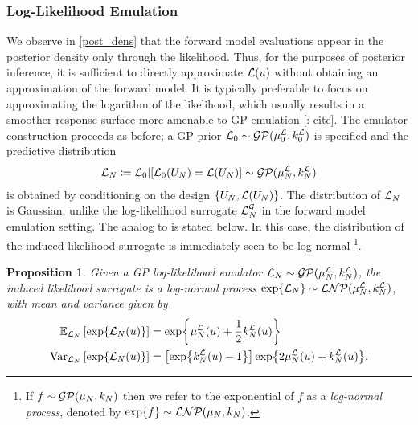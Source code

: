 \documentclass[12pt]{article}
\newtheorem{prop}{Proposition}
\begin{document}
\subsubsection{Log-Likelihood Emulation}
We observe in \ref{post_dens} that the forward model evaluations appear in the posterior density only through the 
likelihood. Thus, for the purposes of posterior inference, it is sufficient to directly approximate $\llik(\Par)$ without 
obtaining an approximation of the forward model. It is typically preferable to focus on approximating the logarithm 
of the likelihood, which usually results in a smoother response surface more amenable to GP emulation [\todo: cite]. 
The emulator construction proceeds as before; a GP prior $\llikPrior \sim \GP(\emMeanPrior{\llik}, \emKerPrior{\llik})$ 
is specified and the predictive distribution 
\begin{align*}
\llikEm[\Ndesign] \Def \llikPrior | [\llikPrior(\designIn) = \llik(\designIn)] \sim \GP(\emMean[\Ndesign]{\llik}, \emKer[\Ndesign]{\llik})
\end{align*}
is obtained by conditioning on the design $\{\designIn, \llik(\designIn)\}$. 
The distribution of $\llikEm[\Ndesign]$ is Gaussian, unlike
the log-likelihood surrogate $\llikEmFwd[\Ndesign]$ in the forward model emulation setting. The analog to 
 is stated below. In this case, the distribution of the induced likelihood 
surrogate is immediately seen to be log-normal
\footnote{If $f \sim \GP(\gpMean, \gpKer)$ then we refer to the exponential of $f$ as a \textit{log-normal process}, 
denoted by $\Exp{f} \sim \LNP(\gpMean, \gpKer)$.}.

\begin{prop} \label{llik_em_lik_emulator_moments}
Given a GP log-likelihood emulator $\llikEm[\Ndesign] \sim \GP(\emMean[\Ndesign]{\llik}, \emKer[\Ndesign]{\llik})$, 
the induced likelihood surrogate is a log-normal process
$\Exp{\llikEm[\Ndesign]} \sim \LNP(\emMean[\Ndesign]{\llik}, \emKer[\Ndesign]{\llik})$, with mean and variance given 
by 
\begin{align}
\E_{\llikEm}\left[\Exp{\llikEm(\Par)} \right] 
&= \Exp{\emMean[\Ndesign]{\llik}(\Par) + \frac{1}{2} \emKer[\Ndesign]{\llik}(\Par)} \\
\Var_{\llikEm}\left[\Exp{\llikEm(\Par)} \right] 
&= \left[\Exp{\emKer[\Ndesign]{\llik}(\Par) - 1} \right] \Exp{2\emMean[\Ndesign]{\llik}(\Par) + \emKer[\Ndesign]{\llik}(\Par)}.
\end{align}
\end{prop}
\end{document}
